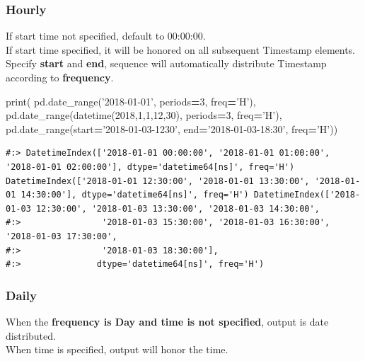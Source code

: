 \documentclass[
]{book}
\newenvironment{Shaded}{\begin{snugshade}}{\end{snugshade}}
\newcommand{\BuiltInTok}[1]{#1}
\newcommand{\DecValTok}[1]{\textcolor[rgb]{0.06,0.06,0.06}{#1}}
\newcommand{\NormalTok}[1]{#1}
\newcommand{\OperatorTok}[1]{\textcolor[rgb]{0.43,0.43,0.43}{\textbf{#1}}}
\newcommand{\StringTok}[1]{\textcolor[rgb]{0.5,0.5,0.5}{#1}}
\begin{document}
\hypertarget{hourly}{%
\subsubsection{Hourly}\label{hourly}}

If start time not specified, default to 00:00:00.\\
If start time specified, it will be honored on all subsequent Timestamp elements.\\
Specify \textbf{start} and \textbf{end}, sequence will automatically distribute Timestamp according to \textbf{frequency}.

\begin{Shaded}
\begin{Highlighting}[]
\BuiltInTok{print}\NormalTok{(}
\NormalTok{  pd.date_range(}\StringTok{'2018-01-01'}\NormalTok{, periods}\OperatorTok{=}\DecValTok{3}\NormalTok{, freq}\OperatorTok{=}\StringTok{'H'}\NormalTok{),}
\NormalTok{  pd.date_range(datetime(}\DecValTok{2018}\NormalTok{,}\DecValTok{1}\NormalTok{,}\DecValTok{1}\NormalTok{,}\DecValTok{12}\NormalTok{,}\DecValTok{30}\NormalTok{), periods}\OperatorTok{=}\DecValTok{3}\NormalTok{, freq}\OperatorTok{=}\StringTok{'H'}\NormalTok{),}
\NormalTok{  pd.date_range(start}\OperatorTok{=}\StringTok{'2018-01-03-1230'}\NormalTok{, end}\OperatorTok{=}\StringTok{'2018-01-03-18:30'}\NormalTok{, freq}\OperatorTok{=}\StringTok{'H'}\NormalTok{))}
\end{Highlighting}
\end{Shaded}

\begin{verbatim}
#:> DatetimeIndex(['2018-01-01 00:00:00', '2018-01-01 01:00:00', '2018-01-01 02:00:00'], dtype='datetime64[ns]', freq='H') DatetimeIndex(['2018-01-01 12:30:00', '2018-01-01 13:30:00', '2018-01-01 14:30:00'], dtype='datetime64[ns]', freq='H') DatetimeIndex(['2018-01-03 12:30:00', '2018-01-03 13:30:00', '2018-01-03 14:30:00',
#:>                '2018-01-03 15:30:00', '2018-01-03 16:30:00', '2018-01-03 17:30:00',
#:>                '2018-01-03 18:30:00'],
#:>               dtype='datetime64[ns]', freq='H')
\end{verbatim}

\hypertarget{daily}{%
\subsubsection{Daily}\label{daily}}

When the \textbf{frequency is Day and time is not specified}, output is date distributed.\\
When time is specified, output will honor the time.
\end{document}
